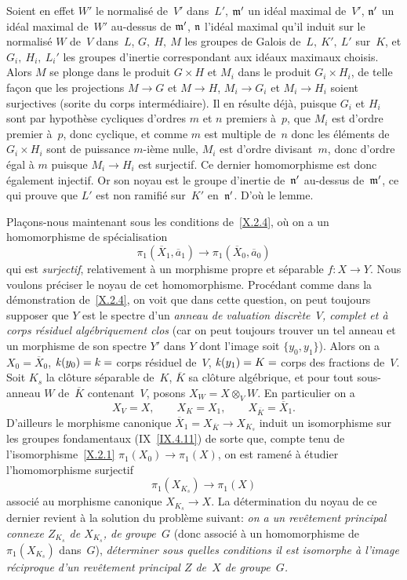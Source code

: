 Soient en effet $W'$ le normalis\'e de~$V'$ dans~$L'$, $\mathfrak{m'}$
un id\'eal maximal de~$V'$, $\mathfrak{n'}$ un id\'eal maximal de~$W'$
au-dessus de
$\mathfrak{m'}$,
$\mathfrak{n}$ l'id\'eal maximal qu'il induit sur le normalis\'e $W$
de~$V$ dans~$L$, $G,\ H,\ M$ les groupes de Galois de~$L,\ K',\ L'$
sur~$K$, et $G_i,\ H_i,\ L_i'$ les groupes d'inertie correspondant aux
id\'eaux maximaux choisis. Alors $M$ se plonge dans le produit
$G\times H$ et $M_i$ dans le produit $G_i\times H_i$, de telle fa\c con que les projections $M\to G$ et $M\to H$, $M_i\to G_i$
et $M_i\to H_i$ soient surjectives (sorite du corps
interm\'ediaire). Il en r\'esulte d\'ej\`a, puisque $G_i$ et
$H_i$ sont par hypoth\`ese cycliques d'ordres $m$ et $n$ premiers
\`a~$p$, que $M_i$ est d'ordre premier \`a~$p$, donc cyclique, et
comme $m$ est multiple de~$n$ donc les \'el\'ements de~$G_i\times
H_i$ sont de puissance
$m$-i\`eme nulle, $M_i$ est d'ordre
divisant~$m$, donc d'ordre \'egal \`a $m$ puisque $M_i\to H_i$ est
surjectif. Ce dernier homomorphisme est donc \'egalement
injectif. Or son noyau est le groupe d'inertie de~$\mathfrak{n'}$
au-dessus de~$\mathfrak{m'}$, ce qui prouve que $L'$ est non ramifi\'e
sur~$K'$ en~$\mathfrak{n'}$. D'o\`u le lemme.

Pla\c cons-nous maintenant sous les conditions de~\ref{X.2.4},
o\`u on a un homomorphisme de sp\'ecialisation
$$
\pi_1(\overline X_1,\overline a_1)\to\pi_1(\overline X_0,\overline
a_0)
$$
qui est \emph{surjectif}, relativement \`a un morphisme propre et
s\'eparable $f\colon X\to Y$. Nous voulons pr\'eciser le noyau de
cet homomorphisme. Proc\'edant comme dans la d\'emonstration
de~\ref{X.2.4}, on voit que dans cette question, on peut toujours
supposer que $Y$ est le spectre d'un \emph{anneau de valuation
discrète~$V$, complet et à corps résiduel
algébriquement clos} (car on peut toujours trouver un tel anneau
et un morphisme de son spectre $Y'$ dans $Y$ dont l'image soit
$\{y_0,y_1\}$). Alors on a $X_0=\overline X_0$, $\mathit{k}(y_0)=k=$ corps
r\'esiduel de~$V$, $\mathit{k}(y_1)=K=$ corps des fractions de~$V$. Soit
$K_s$ la cl\^oture s\'eparable de~$K$, $\overline K$ sa
cl\^oture alg\'ebrique, et pour tout sous-anneau $W$ de~$\overline
K$ contenant~$V$, posons $X_W=X\otimes_V W$. En particulier on a
$$
X_V=X, \qquad X_K=X_1, \qquad X_{\overline K}=\overline X_1.
$$
D'ailleurs le morphisme canonique $\overline X_1=X_{\overline K}\to
X_{K_s}$ induit un isomorphisme sur les groupes fondamentaux
(IX~\ref{IX.4.11}) de sorte que, compte tenu de
l'isomorphisme~\ref{X.2.1} $\pi_1(X_0)\to\pi_1(X)$, on est ramen\'e
\`a \'etudier l'homomorphisme surjectif
$$
\pi_1(X_{K_s})\to\pi_1(X)
$$
associ\'e
au morphisme canonique $X_{K_s}\to X$. La d\'etermination du noyau
de ce dernier revient \`a la solution du probl\`eme suivant:
\emph{on a un revêtement principal connexe $Z_{K_s}$ de
$X_{K_s}$, de groupe~$G$} (donc associ\'e \`a un homomorphisme de
$\pi_1(X_{K_s})$ dans~$G$), \emph{déterminer sous quelles
conditions il est isomorphe à l'image réciproque d'un
revêtement principal $Z$ de~$X$ de groupe~$G$.}

